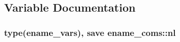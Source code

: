 \subsection{Variable Documentation}
\subsubsection[{\texorpdfstring{nl}{nl}}]{\setlength{\rightskip}{0pt plus 5cm}type({\bf ename\+\_\+vars}), save ename\+\_\+coms\+::nl}\hypertarget{namespaceename__coms_a87d8817dfc69ff263d0afc7954d7dbc0}{}\label{namespaceename__coms_a87d8817dfc69ff263d0afc7954d7dbc0}

